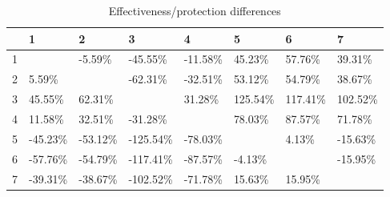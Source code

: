\begin{table}[ht]
\centering
\begin{tabular}{rlllllll}
  \hline
 & 1 & 2 & 3 & 4 & 5 & 6 & 7 \\ 
  \hline
1 &  & -5.59\% & -45.55\% & -11.58\% & 45.23\% & 57.76\% & 39.31\% \\ 
  2 & 5.59\% &  & -62.31\% & -32.51\% & 53.12\% & 54.79\% & 38.67\% \\ 
  3 & 45.55\% & 62.31\% &  & 31.28\% & 125.54\% & 117.41\% & 102.52\% \\ 
  4 & 11.58\% & 32.51\% & -31.28\% &  & 78.03\% & 87.57\% & 71.78\% \\ 
  5 & -45.23\% & -53.12\% & -125.54\% & -78.03\% &  & 4.13\% & -15.63\% \\ 
  6 & -57.76\% & -54.79\% & -117.41\% & -87.57\% & -4.13\% &  & -15.95\% \\ 
  7 & -39.31\% & -38.67\% & -102.52\% & -71.78\% & 15.63\% & 15.95\% &  \\ 
   \hline
\end{tabular}
\caption{Effectiveness/protection differences} 
\end{table}

